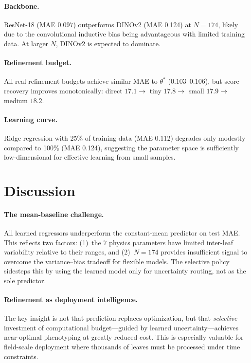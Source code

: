 \documentclass[11pt,a4paper]{article}
\begin{document}
\paragraph{Backbone.}
ResNet-18 (MAE 0.097) outperforms DINOv2 (MAE 0.124) at $N{=}174$,
likely due to the convolutional inductive bias being advantageous
with limited training data. At larger $N$, DINOv2 is expected to dominate.

\paragraph{Refinement budget.}
All real refinement budgets achieve similar MAE to $\theta^*$ ($0.103$--$0.106$),
but score recovery improves monotonically:
direct $17.1 \to$ tiny $17.8 \to$ small $17.9 \to$ medium $18.2$.

\paragraph{Learning curve.}
Ridge regression with 25\% of training data (MAE 0.112) degrades only
modestly compared to 100\% (MAE 0.124), suggesting the parameter space
is sufficiently low-dimensional for effective learning from small samples.

\section{Discussion}
\label{sec:discussion}

\paragraph{The mean-baseline challenge.}
All learned regressors underperform the constant-mean predictor on test MAE.
This reflects two factors: (1)~the 7 physics parameters have limited
inter-leaf variability relative to their ranges, and (2)~$N{=}174$ provides
insufficient signal to overcome the variance--bias tradeoff for flexible models.
The selective policy sidesteps this by using the learned model only for
uncertainty routing, not as the sole predictor.

\paragraph{Refinement as deployment intelligence.}
The key insight is not that prediction replaces optimization, but that
\emph{selective} investment of computational budget---guided by learned
uncertainty---achieves near-optimal phenotyping at greatly reduced cost.
This is especially valuable for field-scale deployment where thousands
of leaves must be processed under time constraints.
\end{document}
